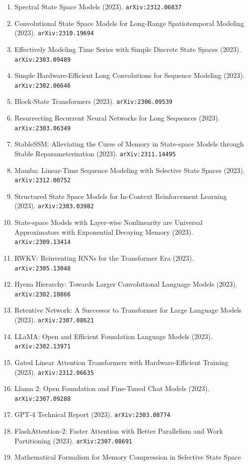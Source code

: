\documentclass[11pt]{article}
\begin{document}
\begin{enumerate}
  \item Spectral State Space Models (2023). \texttt{arXiv:2312.06837}
  \item Convolutional State Space Models for Long-Range Spatiotemporal Modeling (2023). \texttt{arXiv:2310.19694}
  \item Effectively Modeling Time Series with Simple Discrete State Spaces (2023). \texttt{arXiv:2303.09489}
  \item Simple Hardware-Efficient Long Convolutions for Sequence Modeling (2023). \texttt{arXiv:2302.06646}
  \item Block-State Transformers (2023). \texttt{arXiv:2306.09539}
  \item Resurrecting Recurrent Neural Networks for Long Sequences (2023). \texttt{arXiv:2303.06349}
  \item StableSSM: Alleviating the Curse of Memory in State-space Models through
  Stable Reparameterization (2023). \texttt{arXiv:2311.14495}
  \item Mamba: Linear-Time Sequence Modeling with Selective State Spaces (2023). \texttt{arXiv:2312.00752}
  \item Structured State Space Models for In-Context Reinforcement Learning (2023). \texttt{arXiv:2303.03982}
  \item State-space Models with Layer-wise Nonlinearity are Universal
  Approximators with Exponential Decaying Memory (2023). \texttt{arXiv:2309.13414}
  \item RWKV: Reinventing RNNs for the Transformer Era (2023). \texttt{arXiv:2305.13048}
  \item Hyena Hierarchy: Towards Larger Convolutional Language Models (2023). \texttt{arXiv:2302.10866}
  \item Retentive Network: A Successor to Transformer for Large Language Models (2023). \texttt{arXiv:2307.08621}
  \item LLaMA: Open and Efficient Foundation Language Models (2023). \texttt{arXiv:2302.13971}
  \item Gated Linear Attention Transformers with Hardware-Efficient Training (2023). \texttt{arXiv:2312.06635}
  \item Llama 2: Open Foundation and Fine-Tuned Chat Models (2023). \texttt{arXiv:2307.09288}
  \item GPT-4 Technical Report (2023). \texttt{arXiv:2303.08774}
  \item FlashAttention-2: Faster Attention with Better Parallelism and Work
  Partitioning (2023). \texttt{arXiv:2307.08691}
  \item Mathematical Formalism for Memory Compression in Selective State Space

\end{enumerate}
\end{document}
